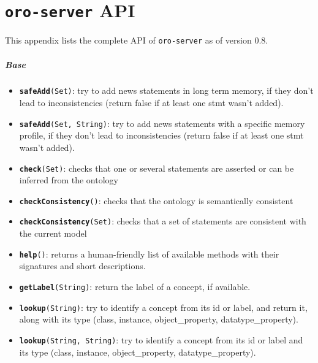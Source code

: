 \chapter{{\tt oro-server} API}

This appendix lists the complete API of {\tt oro-server} as of version 0.8.

\paragraph{Base}
\begin{itemize}

    \item {\tt {\bf safeAdd}(Set)}: try to add news statements in long term
    memory, if they don't lead to inconsistencies (return false if at least one
    stmt wasn't added).

    \item {\tt {\bf safeAdd}(Set, String)}: try to add news statements with a
    specific memory profile, if they don't lead to inconsistencies (return
    false if at least one stmt wasn't added).

    \item {\tt {\bf check}(Set)}: checks that one or several statements are
    asserted or can be inferred from the ontology

    \item {\tt {\bf checkConsistency}()}: checks that the ontology is
    semantically consistent

    \item {\tt {\bf checkConsistency}(Set)}: checks that a set of statements
    are consistent with the current model

    \item {\tt {\bf help}()}: returns a human-friendly list of available
    methods with their signatures and short descriptions.

    \item {\tt {\bf getLabel}(String)}: return the label of a concept, if
    available.

    \item {\tt {\bf lookup}(String)}: try to identify a concept from its id or
    label, and return it, along with its type (class, instance,
    object\_property, datatype\_property).

    \item {\tt {\bf lookup}(String, String)}: try to identify a concept from
    its id or label and its type (class, instance, object\_property,
    datatype\_property).


\end{itemize}
